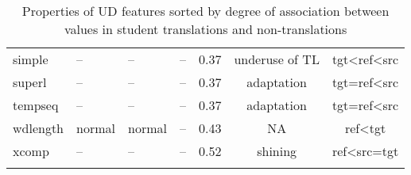 \begin{longtable}{l|p{2cm}p{2cm}p{1.5cm}ccc}
	simple        & --     & --     & --    & 0.37 & underuse of TL  & tgt\textless{}ref\textless{}src \\
	superl        & --     & --     & --    & 0.37 & adaptation     & tgt=ref\textless{}src           \\
	tempseq       & --     & --     & --    & 0.37 & adaptation     & tgt=ref\textless{}src           \\
	wdlength      & normal & normal & --    & 0.43 & NA  & ref\textless{}tgt \\
	xcomp         & --     & --     & --    & 0.52 & shining        & ref\textless{}src=tgt			\\
	\bottomrule
	\caption{\label{tab:stu_indicators}Properties of UD features sorted by degree of association between values in student translations and non-translations}\\
\end{longtable}

